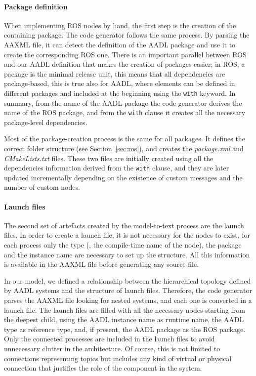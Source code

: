 \paragraph{Package definition} When implementing ROS nodes by hand, the first step is the creation of the containing package. The code generator follows the same process. By parsing the AAXML file, it can detect the definition of the AADL package and use it to create the corresponding ROS one. There is an important parallel between ROS and our AADL definition that makes the creation of packages easier; in ROS, a package is the minimal release unit, this means that all dependencies are package-based, this is true also for AADL, where elements can be defined in different packages and included at the beginning using the \texttt{with} keyword. In summary, from the name of the AADL package the code generator derives the name of the ROS package, and from the \texttt{with} clause it creates all the necessary package-level dependencies.

Most of the package-creation process is the same for all packages. It defines the correct folder structure (see Section~\ref{sec:ros}), and creates the \textit{package.xml} and \textit{CMakeLists.txt} files. These two files are initially created using all the dependencies information derived from the \texttt{with} clause, and they are later updated incrementally depending on the existence of custom messages and the number of custom nodes.

\paragraph{Launch files} The second set of artefacts created by the model-to-text process are the launch files. In order to create a launch file, it is not necessary for the nodes to exist, for each process only the type (\ie, the compile-time name of the node), the package and the instance name are necessary to set up the structure. All this information is available in the AAXML file before generating any source file.

In our model, we defined a relationship between the hierarchical topology defined by AADL systems and the structure of launch files. Therefore, the code generator parses the AAXML file looking for nested systems, and each one is converted in a launch file.  The launch files are filled with all the necessary nodes starting from the deepest child, using the AADL instance name as runtime name, the AADL type as reference type, and, if present, the AADL package as the ROS package. Only the connected processes are included in the launch files to avoid unnecessary clutter in the architecture. Of course, this is not limited to connections representing topics but includes any kind of virtual or physical connection that justifies the role of the component in the system.

